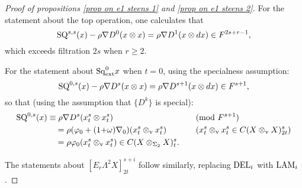 \documentclass[11pt]{amsart} \renewcommand{\baselinestretch}{1.2}
\theoremstyle{plain}
\newtheorem{prop}[thm]{Proposition}
\numberwithin{equation}{section} %
\theoremstyle{plain}
\newtheorem{prop}[thm]{Proposition}
\numberwithin{equation}{chapter} %
\let\oldphi\phi
\let\phi\varphi
\renewcommand{\to}{\longrightarrow}
\newcommand{\twist}{\omega}
\newcommand{\Nabla}{\nabla}
\newcommand{\Sq}{\mathrm{Sq}}
\newcommand{\Edownup}[5]{[E_{#1}^{#2}#3]^{#4}_{#5}}
\newcommand{\dver}{_\mathrm{v}}
\renewcommand{\mapsto}{\longmapsto}
\begin{document}
\begin{second quadrant homotopy sseq operations}
\begin{proof}[Proof of propositions \ref{prop on e1 steens 1} and \ref{prop on e1 steens 2}]
For the statement about the top operation, one calculates that
\[\textup{SQ}^{s,s}(x)-\rho\Nabla D^0(x\otimes x)=\rho\nabla D^{1}(x\otimes dx)\in F^{2s+r-1},\] which exceeds filtration $2s$ when $r\geq2$.



For the statement about $\Sq_\textup{ext}^0x$ when $t=0$, using the specialness assumption:
\[\textup{SQ}^{0,s}(x)-\rho\Nabla D^s(x\otimes x)=\rho\Nabla D^{s+1}(x\otimes dx) \in F^{s+1},\]
so that (using the assumption that $\{D^k\}$ is special):
\begin{alignat*}{2}
\textup{SQ}^{0,s}(x)
&\equiv
\rho\Nabla D^s(x^s_t\otimes x^s_t)&&\textup{(mod $F^{s+1}$)}%
\\
&\quad =
\rho(\oldphi_0+(1{+}\twist)\Nabla_0)(x^s_t\otimes\dver x^s_t)%
&\quad&\text{($x^s_t\otimes\dver x^s_t\in C(X\otimes\dver X)_{2t}^{s}$)}\\
&\quad =
\rho\oldphi_0(x^s_t\otimes\dver x^s_t)\in C(X\otimes_{\Sigma_2} X)_{t}^{s}.
\end{alignat*}

The statements about $\Edownup{r}{}{\Lambda^2X}{s+i}{2t}$ follow similarly, replacing  $\textup{DEL}_i$ with $\textup{LAM}_i$.\end{proof}


\end{second quadrant homotopy sseq operations}
\end{document}
